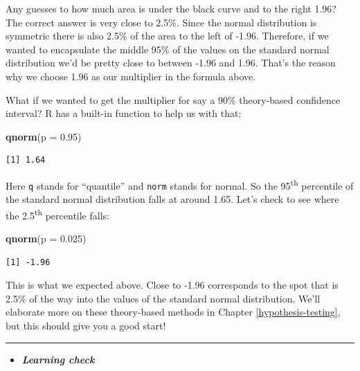 \documentclass[12pt, krantz2,]{krantz}
\makeatletter
\newenvironment{Shaded}{\begin{snugshade}}{\end{snugshade}}
\newcommand{\DataTypeTok}[1]{\textcolor[rgb]{0.27,0.27,0.27}{#1}}
\newcommand{\FloatTok}[1]{\textcolor[rgb]{0.06,0.06,0.06}{#1}}
\newcommand{\KeywordTok}[1]{\textcolor[rgb]{0.27,0.27,0.27}{\textbf{#1}}}
\newcommand{\NormalTok}[1]{#1}
\newenvironment{kframe}{%
\medskip{}
\setlength{\fboxsep}{.8em}
 \def\at@end@of@kframe{}%
 \ifinner\ifhmode%
  \def\at@end@of@kframe{\end{minipage}}%
  \begin{minipage}{\columnwidth}%
 \fi\fi%
 \def\FrameCommand##1{\hskip\@totalleftmargin \hskip-\fboxsep
 \colorbox{shadecolor}{##1}\hskip-\fboxsep
     \hskip-\linewidth \hskip-\@totalleftmargin \hskip\columnwidth}%
 \MakeFramed {\advance\hsize-\width
   \@totalleftmargin\z@ \linewidth\hsize
   \@setminipage}}%
 {\par\unskip\endMakeFramed%
 \at@end@of@kframe}
\renewenvironment{Shaded}{\begin{kframe}}{\end{kframe}}
\newenvironment{rmdblock}[1]
  {\begin{shaded*}
  \begin{itemize}
  \renewcommand{\labelitemi}{
    \raisebox{-.7\height}[0pt][0pt]{
    }
  }
  \item
  }
  {
  \end{itemize}
  \end{shaded*}
  }
\newenvironment{learncheck}
  {\begin{rmdblock}{warning}}
  {\end{rmdblock}}
\makeatother
\begin{document}
Any guesses to how much area is under the black curve and to the right 1.96? The correct answer is very close to 2.5\%. Since the normal distribution is symmetric there is also 2.5\% of the area to the left of -1.96. Therefore, if we wanted to encapsulate the middle 95\% of the values on the standard normal distribution we'd be pretty close to between -1.96 and 1.96. That's the reason why we choose 1.96 as our multiplier in the formula above.

What if we wanted to get the multiplier for say a 90\% theory-based confidence interval? R has a built-in function to help us with that:

\begin{Shaded}
\begin{Highlighting}[]
\KeywordTok{qnorm}\NormalTok{(}\DataTypeTok{p =} \FloatTok{0.95}\NormalTok{)}
\end{Highlighting}
\end{Shaded}

\begin{verbatim}
[1] 1.64
\end{verbatim}

Here \texttt{q} stands for ``quantile'' and \texttt{norm} stands for normal. So the 95\textsuperscript{th} percentile of the standard normal distribution falls at around 1.65. Let's check to see where the 2.5\textsuperscript{th} percentile falls:

\begin{Shaded}
\begin{Highlighting}[]
\KeywordTok{qnorm}\NormalTok{(}\DataTypeTok{p =} \FloatTok{0.025}\NormalTok{)}
\end{Highlighting}
\end{Shaded}

\begin{verbatim}
[1] -1.96
\end{verbatim}

This is what we expected above. Close to -1.96 corresponds to the spot that is 2.5\% of the way into the values of the standard normal distribution. We'll elaborate more on these theory-based methods in Chapter \ref{hypothesis-testing}, but this should give you a good start!

\begin{center}\rule{0.5\linewidth}{\linethickness}\end{center}

\begin{learncheck}
\textbf{\emph{Learning check}}
\end{learncheck}
\end{document}
